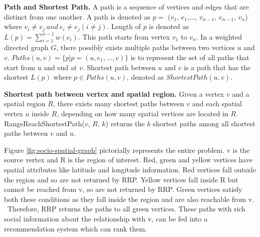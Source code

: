 \textbf{Path and Shortest Path.} A path is a sequence of vertices and edges that are distinct from one another. A path is denoted as $p =$ ($v_1$, $e_1$,..., $v_{n-1}$, $e_{n-1}$, $v_n$) where $v_i\neq v_j~and~e_i\neq e_j (i\neq j)$. Length of $p$ is denoted as $L(p) = \sum\limits_{i = 1}^{n-1}w(e_i)$. This path starts from vertex $v_1$ to $v_n$. In a weighted directed graph $G$, there possibly exists multiple paths between two vertices $u$ and $v$. $Paths(u,v) = \{p|p = (u,e_1,..., v)\}$ is to represent the set of all paths that start from $u$ and end at $v$. Shortest path between $u$ and $v$ is a path that has the shortest $L(p)$ where $p\in Paths(u,v)$, denoted as $ShortestPath(u,v)$.

\textbf{Shortest path between vertex and spatial region.} Given a vertex $v$ and a spatial region $R$, there exists many shortest paths between $v$ and each spatial vertex $u$ inside $R$, depending on how many spatial vertices are located in $R$. RangeReachShortestPath($v$, $R$, $k$) returns the $k$ shortest paths among all shortest paths between $v$ and $u$.

Figure \ref{fig:socio-spatial-graph} pictorially represents the entire problem. v is the source vertex and R is the region of interest. Red, green and yellow vertices have spatial attributes like latitude and longitude information. Red vertices fall outside the region and so are not returned by RRP. Yellow vertices fall inside R but cannot be reached from v, so are not returned by RRP. Green vertices satisfy both these conditions as they fall inside the region and are also reachable from v. ~Therefore, RRP returns the paths to all green vertices. These paths with rich social information about the relationship with v, can be fed into a recommendation system which can rank them.